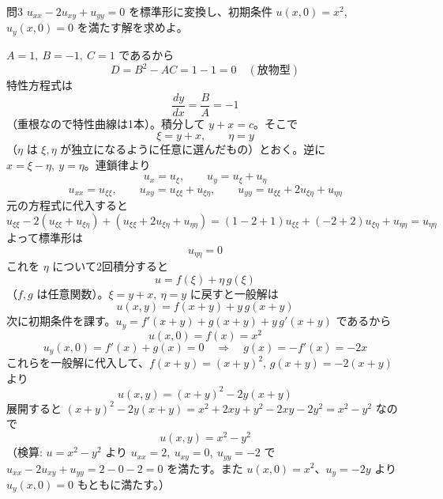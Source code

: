 \documentclass[a4paper,11pt]{article}
\begin{document}
\clearpage
\begin{mondaiboxS}{問3}
$u_{xx} - 2u_{xy} + u_{yy} = 0$ を標準形に変換し、初期条件 $u(x,0)=x^{2}$, $u_y(x,0)=0$ を満たす解を求めよ。
\end{mondaiboxS}
\kaitou
$A=1,\ B=-1,\ C=1$ であるから
\[
D = B^{2}-AC = 1-1 = 0 \quad (\text{放物型})
\]
特性方程式は
\[
\frac{dy}{dx} = \frac{B}{A} = -1
\]
（重根なので特性曲線は1本）。積分して $y+x=c$。そこで
\[
\xi = y+x, \qquad \eta = y
\]
（$\eta$ は $\xi,\eta$ が独立になるように任意に選んだもの）とおく。逆に $x=\xi-\eta,\ y=\eta$。連鎖律より
\[
u_x = u_\xi, \qquad u_y = u_\xi + u_\eta
\]
\[
u_{xx}=u_{\xi\xi}, \qquad u_{xy}=u_{\xi\xi}+u_{\xi\eta}, \qquad u_{yy}=u_{\xi\xi}+2u_{\xi\eta}+u_{\eta\eta}
\]
元の方程式に代入すると
\[
u_{\xi\xi} - 2(u_{\xi\xi}+u_{\xi\eta}) + (u_{\xi\xi}+2u_{\xi\eta}+u_{\eta\eta})
= (1-2+1)u_{\xi\xi} + (-2+2)u_{\xi\eta} + u_{\eta\eta} = u_{\eta\eta}
\]
よって標準形は
\[
u_{\eta\eta} = 0
\]
これを $\eta$ について2回積分すると
\[
u = f(\xi) + \eta\,g(\xi)
\]
（$f,g$ は任意関数）。$\xi=y+x,\ \eta=y$ に戻すと一般解は
\[
u(x,y) = f(x+y) + y\,g(x+y)
\]
次に初期条件を課す。$u_y = f'(x+y) + g(x+y) + y\,g'(x+y)$ であるから
\[
u(x,0) = f(x) = x^{2}
\]
\[
u_y(x,0) = f'(x) + g(x) = 0 \quad\Longrightarrow\quad g(x) = -f'(x) = -2x
\]
これらを一般解に代入して、$f(x+y)=(x+y)^2$, $g(x+y)=-2(x+y)$ より
\[
u(x,y) = (x+y)^{2} - 2y(x+y)
\]
展開すると $(x+y)^2 - 2y(x+y) = x^2+2xy+y^2-2xy-2y^2 = x^2 - y^2$ なので
\[
\boxed{\; u(x,y) = x^{2} - y^{2} \;}
\]
（検算: $u=x^2-y^2$ より $u_{xx}=2,\ u_{xy}=0,\ u_{yy}=-2$ で $u_{xx}-2u_{xy}+u_{yy}=2-0-2=0$ を満たす。また $u(x,0)=x^2$、$u_y=-2y$ より $u_y(x,0)=0$ もともに満たす。）
\end{document}
